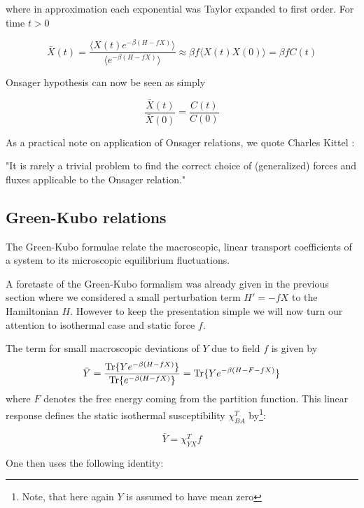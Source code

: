 \documentclass[a4paper,12pt]{article}
\begin{document}
where in approximation each exponential was Taylor expanded to first order.
For time $t>0$

\begin{equation}
  \bar{X}(t)=\frac{\langle X(t) e^{-\beta (H-f X)} \rangle}{\langle e^{-\beta (H-f X)} \rangle} \approx \beta f \langle X(t)X(0) \rangle= \beta f C(t)
\end{equation}

Onsager hypothesis can now be seen as simply

\begin{equation}
  \frac{\bar{X}(t)}{\bar{X}(0)}=\frac{C(t)}{C(0)}
\end{equation}

As a practical note on application of Onsager relations, we quote Charles Kittel \cite{Kittel:817295}:

"It is rarely a trivial problem to find the correct choice of (generalized) forces and fluxes applicable to the Onsager relation."


\subsection{Green-Kubo relations}

The Green-Kubo formulae relate the macroscopic, linear transport coefficients of a system to its microscopic equilibrium fluctuations.

A foretaste of the Green-Kubo formalism was already given in the previous section where we considered a small perturbation term $H'=-f X$ to the Hamiltonian $H$. However to keep the presentation simple we will now turn our attention to isothermal case and static force $f$.

The term for small macroscopic deviations of $Y$ due to field $f$ is given by
\begin{equation}
\bar{Y}=\frac{\Tr\{ Y e^{-\beta (H-f X)} \}}{\Tr\{ e^{-\beta (H-f X)} \}} = \Tr\{ Y e^{-\beta (H - F -f X )} \}
\end{equation}
where $F$ denotes the free energy coming from the partition function. This linear response defines the static isothermal susceptibility $\chi_{BA}^T$ by\footnote{Note, that here again $Y$ is assumed to have mean zero}:

\begin{equation}
  \bar{Y} =\chi_{YX}^T f
\end{equation}

One then uses the following identity\cite{Kubo:1957cl}:
\end{document}
